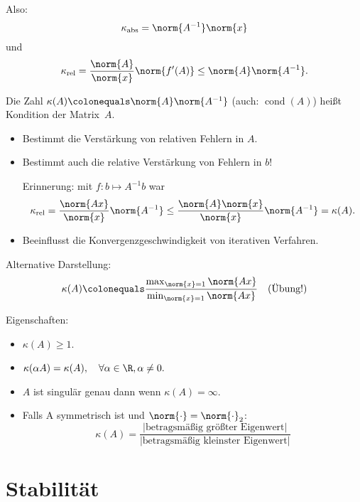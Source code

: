 Also:
\begin{equation*}
\kappa_\text{abs} = \norm{A^{-1}}\norm{x}
\end{equation*}
und
\begin{equation*}
\kappa_\text{rel} = \frac{\norm{A}}{\norm{x}}\norm{f'(A)}\leq \norm{A}\norm{A^{-1}}.
\end{equation*}

\begin{defi}
  Die Zahl $\kappa(A) \colonequals \norm{A}\norm{A^{-1}}$ (auch: $\operatorname{cond}(A)$) heißt Kondition der Matrix~$A$.
\end{defi}

\begin{itemize}
  \item Bestimmt die Verstärkung von relativen Fehlern in $A$. 
  \item Bestimmt auch die relative Verstärkung von Fehlern in $b$!

  Erinnerung: mit $f:b\mapsto A^{-1}b$ war
  \begin{equation*}
   \kappa_\text{rel}
   =
   \frac{\norm{Ax}}{\norm{x}}\norm{A^{-1}}
   \leq \frac{\norm{A}\norm{x}}{\norm{x}}\norm{A^{-1}}
   =
   \kappa(A).
  \end{equation*}
  \item Beeinflusst die Konvergenzgeschwindigkeit von iterativen Verfahren.
\end{itemize}

Alternative Darstellung:
\begin{equation*}
\kappa(A) \colonequals \frac{\max_{\norm{x}=1}\norm{Ax}}{\min_{\norm{x}=1} \norm{Ax}}\quad \text{(Übung!)}
\end{equation*}

Eigenschaften:
\begin{itemize}
  \item $\kappa(A) \geq 1$.
  \item $\kappa(\alpha A) = \kappa(A), \quad \forall \alpha \in \R, \alpha \neq 0.$
  \item $A$ ist singulär genau dann wenn $\kappa(A) = \infty$.
  \item Falls A symmetrisch ist und $\norm{\cdot} = \norm{\cdot}_2$:
\[\kappa(A) = \frac{\vert \text{betragsmäßig größter Eigenwert}\vert}{\vert\text{betragsmäßig kleinster Eigenwert}\vert}\]
\end{itemize}


\section{Stabilität}


